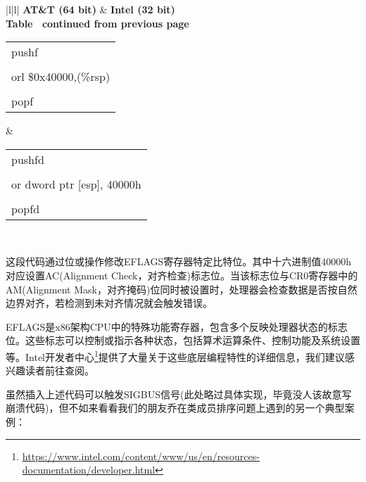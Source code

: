 \begin{longtable}{|l|l|}
\hline
\textbf{AT\&T (64 bit)} &
  \textbf{Intel (32 bit)} \\ \hline
\endfirsthead
%
%
{{\bfseries Table \thetable\ continued from previous page}} \\
\endhead
%
\begin{tabular}[c]{@{}l@{}}pushf \\ \\ orl \$0x40000,(\%rsp) \\ \\ popf\end{tabular} &
  \begin{tabular}[c]{@{}l@{}}pushfd\\ \\ or dword ptr {[}esp{]}, 40000h \\ \\ popfd\end{tabular} \\ \hline
\end{longtable}

这段代码通过位或操作修改EFLAGS寄存器特定比特位。其中十六进制值40000h对应设置AC(Alignment Check，对齐检查)标志位。当该标志位与CR0寄存器中的AM(Alignment Mask，对齐掩码)位同时被设置时，处理器会检查数据是否按自然边界对齐，若检测到未对齐情况就会触发错误。

EFLAGS是x86架构CPU中的特殊功能寄存器，包含多个反映处理器状态的标志位。这些标志可以控制或指示各种状态，包括算术运算条件、控制功能及系统设置等。Intel开发者中心\footnote{\url{https://www.intel.com/content/www/us/en/resources-documentation/developer.html}}提供了大量关于这些底层编程特性的详细信息，我们建议感兴趣读者前往查阅。

虽然插入上述代码可以触发SIGBUS信号(此处略过具体实现，毕竟没人该故意写崩溃代码)，但不如来看看我们的朋友乔在类成员排序问题上遇到的另一个典型案例：
